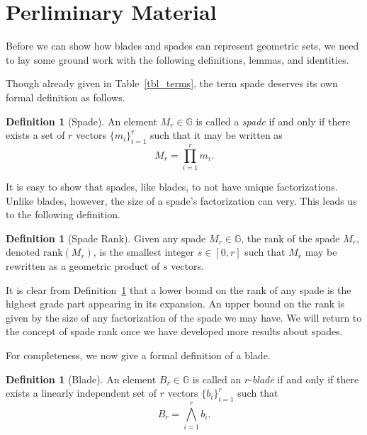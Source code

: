 \documentclass{birkjour}
\theoremstyle{definition}
\newtheorem{defn}[thm]{Definition}
\theoremstyle{remark}
\numberwithin{equation}{section}
\newcommand{\G}{\mathbb{G}}
\newcommand{\rank}{\mbox{rank}}
\begin{document}
\section{Perliminary Material}

Before we can show how blades and spades can represent geometric sets, we need to lay some ground work
with the following definitions, lemmas, and identities.

Though already given in Table~\ref{tbl_terms}, the term spade deserves its own formal definition as follows.
\begin{defn}[Spade]
An element $M_r\in\G$ is called a \emph{spade} if and only if there exists a set of $r$ vectors $\{m_i\}_{i=1}^r$
such that it may be written as
\begin{equation}\label{equ_M_r}
M_r = \prod_{i=1}^r m_i.
\end{equation}
\end{defn}
It is easy to show that spades, like blades, to not have unique factorizations.  Unlike blades, however, the
size of a spade's factorization can very.  This leads us to the following definition.
\begin{defn}[Spade Rank]\label{def_spade_rank}
Given any spade $M_r\in\G$, the rank of the spade $M_r$, denoted $\rank(M_r)$, is the
smallest integer $s\in[0,r]$ such that $M_r$ may be rewritten as a geometric product of $s$ vectors.
\end{defn}

It is clear from Definition~\ref{def_spade_rank} that a lower bound on the rank of any spade
is the highest grade part appearing in its expansion.  An upper bound on the rank is given by
the size of any factorization of the spade we may have.  We will return to the concept of spade
rank once we have developed more results about spades.

For completeness, we now give a formal definition of a blade.
\begin{defn}[Blade]
An element $B_r\in\G$ is called an $r$-\emph{blade} if and only if there exists a linearly independent set of $r$
vectors $\{b_i\}_{i=1}^r$ such that
\begin{equation}\label{equ_B_r}
B_r = \bigwedge_{i=1}^r b_i.
\end{equation}
\end{defn}
\end{document}
